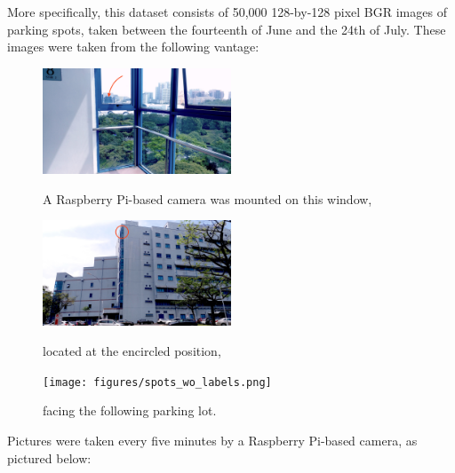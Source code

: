 \documentclass[a4paper, 11pt]{article} %
\begin{document}
		\hspace*{-6mm}More specifically, this dataset consists of 50,000 128-by-128 pixel BGR images of 
		parking spots, taken between the fourteenth of June and the 24th of July. These images were taken 
		from the following vantage:
		\vskip 5mm
		\begin{figure}[H]
			\centering
			\includegraphics[width=0.5\textwidth]{figures/context_1.jpg}
			\caption{A Raspberry Pi-based camera was mounted on this window,}
			\vskip 5mm
			\includegraphics[width=0.5\textwidth]{figures/context_2.jpg}
			\caption{located at the encircled position,}
			\vskip 5mm
			\texttt{[image: figures/spots\_wo\_labels.png]}
			\caption{facing the following parking lot.}
		\end{figure}
		Pictures were taken every five minutes by a Raspberry Pi-based camera, as pictured below:
		\vskip 5mm
\end{document}

